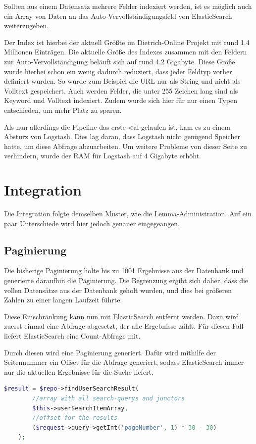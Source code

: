 Sollten aus einem Datensatz mehrere Felder indexiert werden, ist es möglich auch ein Array von Daten an das Auto-Vervollständigungsfeld von ElasticSearch weiterzugeben.

Der Index ist hierbei der aktuell Größte im Dietrich-Online Projekt mit rund 1.4 Millionen Einträgen. Die aktuelle Größe des Indexes zusammen mit den Feldern zur Auto-Vervollständigung beläuft sich auf rund 4.2 Gigabyte. 
Diese Größe wurde hierbei schon ein wenig dadurch reduziert, dass jeder Feldtyp vorher definiert wurden. So wurde zum Beispiel die URL nur als String und nicht als Volltext gespeichert. Auch werden Felder, die unter 255 Zeichen lang sind als Keyword und Volltext indexiert. Zudem wurde sich hier für nur einen Typen entschieden, um mehr Platz zu sparen.

Als nun allerdings die Pipeline das erste <al gelaufen ist, kam es zu einem Absturz von Logstash. Dies lag daran, dass Logstash nicht genügend Speicher hatte, um diese Abfrage abzuarbeiten. Um weitere Probleme von dieser Seite zu verhindern, wurde der RAM für Logstash auf 4 Gigabyte erhöht.

\section{Integration}

Die Integration folgte demselben Muster, wie die Lemma-Administration. Auf ein paar Unterschiede wird hier jedoch genauer eingegeangen. 

\subsection{Paginierung}

Die bisherige Paginierung holte bis zu 1001 Ergebnisse aus der Datenbank und generierte daraufhin die Paginierung. Die Begrenzung ergibt sich daher, dass die vollen Datensätze aus der Datenbank geholt wurden, und dies bei größeren Zahlen zu einer langen Laufzeit führte.

Diese Einschränkung kann nun mit ElasticSearch entfernt werden. Dazu wird zuerst einmal eine Abfrage abgesetzt, der alle Ergebnisse zählt. Für diesen Fall liefert ElasticSearch eine Count-Abfrage mit.

Durch diesen wird eine Paginierung generiert. Dafür wird mithilfe der Seitennummer ein Offset für die Abfrage generiert, sodass ElasticSearch immer nur die aktuellen Ergebnisse für die Suche liefert.

\begin{lstlisting}[language=PHP, frame=single, label={lst:generierung}] 
    $result = $repo->findUserSearchResult(
        //array with all search-querys and junctors
        $this->userSearchItemArray, 
        //offset for the results
        ($request->query->getInt('pageNumber', 1) * 30 - 30)
    );
\end{lstlisting}


